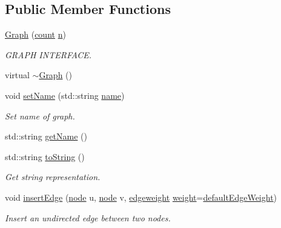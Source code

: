 \subsection*{Public Member Functions}
\begin{DoxyCompactItemize}
\item 
\hyperlink{class_ensemble_clustering_1_1_graph_ac139a4b2a1db5de1535ea23ac526e893}{Graph} (\hyperlink{namespace_ensemble_clustering_a2482e94ca22a0c6544a5a9173186fde8}{count} \hyperlink{class_ensemble_clustering_1_1_graph_a025fcfba990314b11b1f27d077b5319a}{n})
\begin{DoxyCompactList}\small\item\em G\-R\-A\-P\-H I\-N\-T\-E\-R\-F\-A\-C\-E. \end{DoxyCompactList}\item 
virtual \hyperlink{class_ensemble_clustering_1_1_graph_ac8368ff972ce067d51e37c48124a0038}{$\sim$\-Graph} ()
\item 
void \hyperlink{class_ensemble_clustering_1_1_graph_ad3f7fd50883aa16ab0d7fcdd32c6ed36}{set\-Name} (std\-::string \hyperlink{class_ensemble_clustering_1_1_graph_a519d6a3c44c3a6d8f46ba448cb691710}{name})
\begin{DoxyCompactList}\small\item\em Set name of graph. \end{DoxyCompactList}\item 
std\-::string \hyperlink{class_ensemble_clustering_1_1_graph_a54b144cd2a43777b8e1d845b17ae8448}{get\-Name} ()
\item 
std\-::string \hyperlink{class_ensemble_clustering_1_1_graph_a49d3be3a2881ed5f49ba385c3263ec76}{to\-String} ()
\begin{DoxyCompactList}\small\item\em Get string representation. \end{DoxyCompactList}\item 
void \hyperlink{class_ensemble_clustering_1_1_graph_a3ea3742cf6aeeaf69dffc4f9cf739f22}{insert\-Edge} (\hyperlink{namespace_ensemble_clustering_ae829290aeccd1a420b17a37fd901f114}{node} u, \hyperlink{namespace_ensemble_clustering_ae829290aeccd1a420b17a37fd901f114}{node} v, \hyperlink{namespace_ensemble_clustering_ab3fbffa545e4c22660e80229ca1a7d4a}{edgeweight} \hyperlink{class_ensemble_clustering_1_1_graph_ad24e78f88db1eeadfbf3956cfa1e9ccf}{weight}=\hyperlink{class_ensemble_clustering_1_1_graph_a8186ee969064a4e12b779b1dc506ac60}{default\-Edge\-Weight})
\begin{DoxyCompactList}\small\item\em Insert an undirected edge between two nodes. \end{DoxyCompactList}\item 

\end{DoxyCompactItemize}
